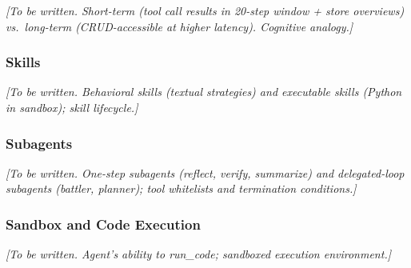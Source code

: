 \textit{[To be written. Short-term (tool call results in 20-step window + store overviews) vs.\ long-term (CRUD-accessible at higher latency). Cognitive analogy.]}

\subsubsection{Skills}\label{sec:skills}

\textit{[To be written. Behavioral skills (textual strategies) and executable skills (Python in sandbox); skill lifecycle.]}

\subsubsection{Subagents}\label{sec:subagents}

\textit{[To be written. One-step subagents (reflect, verify, summarize) and delegated-loop subagents (battler, planner); tool whitelists and termination conditions.]}

\subsubsection{Sandbox and Code Execution}\label{sec:sandbox}

\textit{[To be written. Agent's ability to run\_code; sandboxed execution environment.]}
